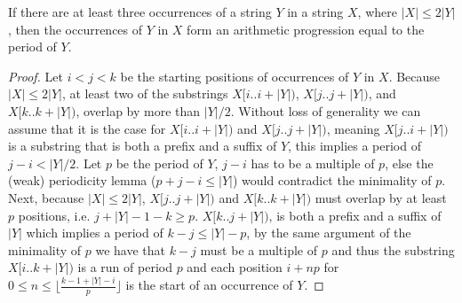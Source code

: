 \begin{corollary*}
    If there are at least three occurrences of a string $Y$ in a string $X$, where $|X| \leq 2|Y|$, then the occurrences of $Y$ in $X$ form an arithmetic progression equal to the period of $Y$. 
\end{corollary*}
\begin{proof}
    Let $i<j<k$ be the starting positions of occurrences of $Y$ in $X$. Because $|X| \leq 2|Y|$, at least two of the substrings $X[i..i+|Y|)$, $X[j..j+|Y|)$, and $X[k..k+|Y|)$, overlap by more than $|Y|/2$.
    Without loss of generality we can assume that it is the case for $X[i..i+|Y|)$ and $X[j..j+|Y|)$, meaning $X[j..i+|Y|)$ is a substring that is both a prefix and a suffix of $Y$, this implies a period of $j-i < |Y|/2$. 
    Let $p$ be the period of $Y$, $j-i$ has to be a multiple of $p$, else the (weak) periodicity lemma ($p+j-i \leq |Y|$) would contradict the minimality of $p$.
    Next, because $|X| \leq 2|Y|$, $X[j..j+|Y|)$ and $X[k..k+|Y|)$ must overlap by at least $p$ positions, i.e. $j+|Y|-1-k \geq p$. 
    $X[k..j+|Y|)$, is both a prefix and a suffix of $|Y|$ which implies a period of $k-j \leq |Y| - p $, by the same argument of the minimality of $p$ we have that $k-j$ must be a multiple of $p$ and thus the substring $X[i..k+|Y|)$ is a run of period $p$ and each position $i+np$ for $0 \leq n \leq \lfloor \frac{k-1+|Y|-i}{p} \rfloor$ is the start of an occurrence of $Y$.
\end{proof}
